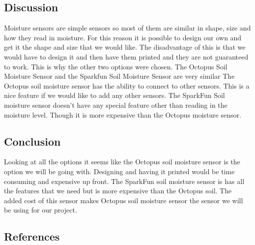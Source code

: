 \documentclass[onecolumn, draftclsnofoot,10pt, compsoc]{IEEEtran}
\begin{document}
		\subsection{Discussion}
		Moisture sensors are simple sensors so most of them are similar in shape,
		size and how they read in moisture. For this reason it is possible to design
		our own and get it the shape and size that we would like. The disadvantage of this
		is that we would have to design it and then have them printed and they are
		not guaranteed to work. This is why the other two options were chosen. The
		Octopus Soil Moisture Sensor and the Sparkfun Soil Moisture Sensor are very similar
		The Octopus soil moisture sensor has the ability to connect to other sensors.
		This is a nice feature if we would like to add any other sensors. The SparkFun
		Soil moisture sensor doesn't have any special feature other than reading in
		the moisture level. Though it is more expensive than the Octopus moisture sensor.
		\subsection{Conclusion}
		Looking at all the options it seems like the Octopus soil moisture sensor is
		the option we will be going with. Designing and having it printed would be
		time consuming and expensive up front. The SparkFun soil moisture sensor is
		has all the features that we need but is more expensive than the Octopus soil.
		The added cost of this sensor makes Octopus soil moisture sensor the sensor
		we will be using for our project.

				\subsection*{References}
				\begingroup
					\renewcommand{\addcontentsline}[3]{}%
					\renewcommand{\section}[2]{}%
					
					
				\endgroup
\end{document}
